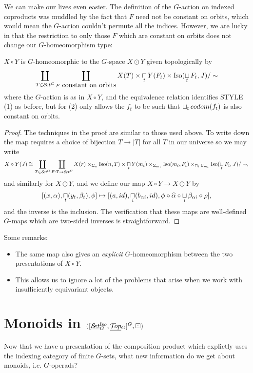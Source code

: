 \documentclass{report}
\newcommand{\Top}{\text{$\mathcal{T}\!op$}}
\newcommand{\Set}{\text{$\mathcal{S}\!et$}}
\DeclareMathOperator{\Iso}{Iso}
\newcommand{\TopG}{\text{\underline{$\Top$}$_G$}}
\newcommand{\SetG}{\text{\underline{$\Set$}$_G^{\mbox{\scriptsize Iso}}$}}
\renewcommand{\ST}{\text{$[\SetG,\TopG]^G$}}
\newcommand{\icap}{\operatornamewithlimits{\sqcap}}
\newcommand{\ico}{\operatornamewithlimits{\sqcup}}
\renewcommand{\hat}[1]{\text{$\widehat{#1}$}}
\begin{document}
We can make our lives even easier. The definition of the $G$-action on indexed coproducts was muddled by the fact that $F$ need not be constant on orbits, which would mean the $G$-action couldn't permute all the indices. However, we are lucky in that the restriction to only those $F$ which are constant on orbits does not change our $G$-homeomorphism type:
\begin{prop}
  $X\circ Y$ is $G$-homeomorphic to the $G$-space $X\odot Y$ given topologically by 
\[\coprod_{T\in\Set^G}\coprod_{F \mbox{ constant on orbits}}X(T)\times\icap_tY(F_t)\times\Iso(\ico_tF_t,J)/\sim\]
where the $G$-action is as in $X\circ Y$, and the equivalence relation identifies STYLE (1) as before, but for (2) only allows the $f_t$ to be such that $\ico_tcodom(f_t)$ is also constant on orbits. 
\end{prop}
\begin{proof}
  The techniques in the proof are similar to those used above. To write down the map requires a choice of bijection $T\to|T|$ for all $T$ in our universe so we may write
\[X\circ Y(J) \cong \coprod_{T\in\Set^G}\coprod_{F:T\to\Set^G}X(r)\times_{\Sigma_n}\Iso(n,T)\times\icap_tY(m_t)\times_{\Sigma_{m_t}}\Iso(m_t,F_t)\times_{\icap_t\Sigma_{m_t}}\Iso(\ico_tF_t,J)/\sim,\]
and similarly for $X\odot Y$, and we define our map $X\circ Y \to X\odot Y$ by
\[[(x,\alpha),\icap_t(y_t,\beta_t),\phi]\mapsto [(a,id),\icap_i(b_{\alpha i}, id),\phi\circ \hat\alpha\circ\ico_i\beta_{\alpha i}\circ \rho],\]
and the inverse is the inclusion. The verification that these maps are well-defined $G$-maps which are two-sided inverses is straightforward.
\end{proof}

Some remarks:
\begin{itemize}\itemsep-4pt
\item The same map also gives an {\em explicit} $G$-homeomorphism between the two presentations of $X\circ Y$.
\item This allows us to ignore a lot of the problems that arise when we work with insufficiently equivariant objects.
\end{itemize}




\section{Monoids in $(\ST, \boxdot)$}
Now that we have a presentation of the composition product which explictly uses the indexing category of finite $G$-sets, what new information do we get about monoids, i.e. $G$-operads?
\end{document}
